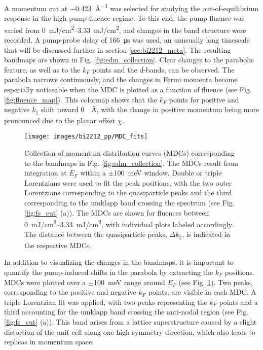A momentum cut at \qty{-0.423}{\angstrom^{-1}} was selected for studying the out-of-equilibrium response in the high pump-fluence regime.
To this end, the pump fluence was varied from \qtyrange{0}{3.33}{\milli\joule/\centi\meter\squared}, and changes in the band structure were recorded.
A pump-probe delay of \qty{166}{\micro\second} was used, an unusually long timescale that will be discussed further in section \ref{sec:bi2212_meta}.
The resulting bandmaps are shown in Fig. \ref{fig:edm_collection}.
Clear changes to the parabolic feature, as well as to the $k_F$ points and the  d-bands, can be observed.
The parabola narrows continuously, and the changes in Fermi momenta become especially noticeable when the MDC is plotted as a function of fluence (see Fig. \ref{fig:fluence_map}).
This colormap shows that the $k_F$ points for positive and negative $k_\parallel$ shift toward \qty{0}{\per\angstrom}, with the change in positive momentum being more pronounced due to the planar offset $\chi$.

\begin{figure}[t]
	\centering
	\texttt{[image: images/bi2212\_pp/MDC\_fits]}
	\caption{Collection of momentum distribution curves (MDCs) corresponding to the bandmaps in Fig. \ref{fig:edm_collection}. The MDCs result from integration at $E_F$ within a $\pm$\qty{100}{\milli\electronvolt} window. Double or triple Lorentzians were used to fit the peak positions, with the two outer Lorentzians corresponding to the quasiparticle peaks and the third corresponding to the umklapp band crossing the spectrum (see Fig. \ref{fig:fs_cut} (a)). The MDCs are shown for fluences between \qtyrange{0}{3.33}{\milli\joule/\centi\meter\squared}, with individual plots labeled accordingly. The distance between the quasiparticle peaks, $\Delta k_\parallel$, is indicated in the respective MDCs.}
	\label{fig:mdc_fits}
\end{figure}

In addition to visualizing the changes in the bandmaps, it is important to quantify the pump-induced shifts in the parabola by extracting the $k_F$ positions.
MDCs were plotted over a $\pm$\qty{100}{\milli\electronvolt} range around $E_F$ (see Fig. \ref{fig:mdc_fits}).
Two peaks, corresponding to the positive and negative $k_F$ points, are visible in each MDC.
A triple Lorentzian fit was applied, with two peaks representing the $k_F$ points and a third accounting for the umklapp band crossing the anti-nodal region (see Fig. \ref{fig:fs_cut} (a)).
This band arises from a lattice superstructure caused by a slight distortion of the unit cell along one high-symmetry direction, which also leads to replicas in momentum space.

